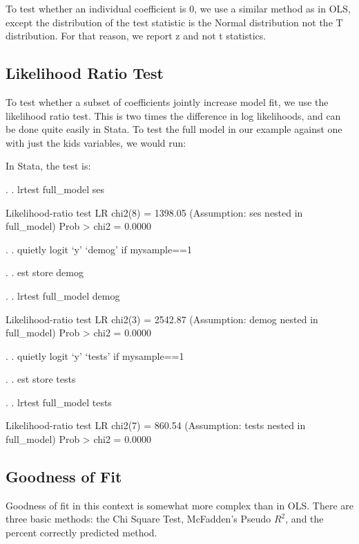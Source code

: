 \documentclass[12pt]{article}
\begin{document}
To test whether an individual coefficient is 0, we use  a similar
method as in OLS, except the distribution of the test statistic is the
Normal distribution not the T distribution. For that reason, we report
z and not t statistics. 

\subsection{Likelihood Ratio Test}

To test whether a subset of coefficients jointly increase model fit,
we use the likelihood ratio test. This is two times the difference in
log likelihoods, and can be done quite easily in Stata. To test the
full model in our example against one with just the kids variables, we
would run:

In Stata, the test is: 

\begin{stlog}


. 
. lrtest full_model ses

Likelihood-ratio test                                 LR chi2(8)  =   1398.05
(Assumption: ses nested in full_model)                Prob > chi2 =    0.0000

. 
. quietly logit `y'  `demog' if mysample==1

. 
. est store demog

. 
. lrtest full_model demog

Likelihood-ratio test                                 LR chi2(3)  =   2542.87
(Assumption: demog nested in full_model)              Prob > chi2 =    0.0000

. 
. quietly logit `y' `tests' if mysample==1

. 
. est store tests

. 
. lrtest full_model tests

Likelihood-ratio test                                 LR chi2(7)  =    860.54
(Assumption: tests nested in full_model)              Prob > chi2 =    0.0000


\end{stlog}



\subsection{Goodness of Fit}

Goodness of fit in this context is somewhat more complex than in
OLS. There are three basic methods: the Chi Square Test, McFadden's
Pseudo $R^2$, and the percent correctly predicted method.
\end{document}
